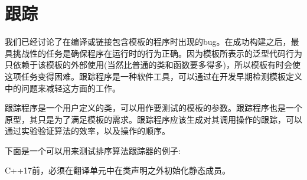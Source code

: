 \section{跟踪}
我们已经讨论了在编译或链接包含模板的程序时出现的bug。在成功构建之后，最具挑战性的任务是确保程序在运行时的行为正确。因为模板所表示的泛型代码行为只依赖于该模板的外部使用(当然比普通的类和函数要多得多)，所以模板有时会使这项任务变得困难。跟踪程序是一种软件工具，可以通过在开发早期检测模板定义中的问题来减轻这方面的工作。

跟踪程序是一个用户定义的类，可以用作要测试的模板的参数。跟踪程序也是一个原型，其只是为了满足模板的需求。跟踪程序应该生成对其调用操作的跟踪，可以通过实验验证算法的效率，以及操作的顺序。

下面是一个可以用来测试排序算法跟踪器的例子:

\begin{notice}
C++17前，必须在翻译单元中在类声明之外初始化静态成员。
\end{notice}

